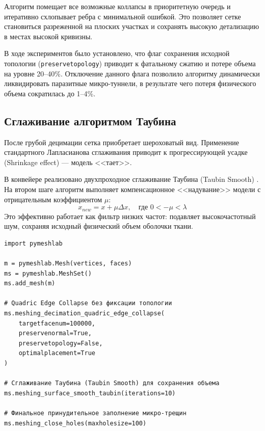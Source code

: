 \documentclass[a4paper,14pt]{article}
\begin{document}
Алгоритм помещает все возможные коллапсы в приоритетную очередь и итеративно схлопывает ребра с минимальной ошибкой. Это позволяет сетке становиться разреженной на плоских участках и сохранять высокую детализацию в местах высокой кривизны. 

В ходе экспериментов было установлено, что флаг сохранения исходной топологии (\texttt{preservetopology}) приводит к фатальному сжатию и потере объема на уровне 20--40\%. Отключение данного флага позволило алгоритму динамически ликвидировать паразитные микро-туннели, в результате чего потеря физического объема сократилась до 1--4\%.

\subsection{Сглаживание алгоритмом Таубина}
После грубой децимации сетка приобретает шероховатый вид. Применение стандартного Лапласианова сглаживания приводит к прогрессирующей усадке (Shrinkage effect) — модель <<тает>>.

В конвейере реализовано двухпроходное сглаживание Таубина (Taubin Smooth) \cite{taubin1995}. На втором шаге алгоритм выполняет компенсационное <<надувание>> модели с отрицательным коэффициентом $\mu$:
\begin{equation}
    x_{new} = x + \mu \Delta x, \quad \text{где } 0 < -\mu < \lambda
\end{equation}
Это эффективно работает как фильтр низких частот: подавляет высокочастотный шум, сохраняя исходный физический объем оболочки ткани.

\begin{lstlisting}[caption={Интеграция PyMeshLab для децимации}]
import pymeshlab

m = pymeshlab.Mesh(vertices, faces)
ms = pymeshlab.MeshSet()
ms.add_mesh(m)

# Quadric Edge Collapse без фиксации топологии
ms.meshing_decimation_quadric_edge_collapse(
    targetfacenum=100000, 
    preservenormal=True, 
    preservetopology=False, 
    optimalplacement=True
)

# Сглаживание Таубина (Taubin Smooth) для сохранения объема
ms.meshing_surface_smooth_taubin(iterations=10)

# Финальное принудительное заполнение микро-трещин
ms.meshing_close_holes(maxholesize=100)
\end{lstlisting}

\newpage
\end{document}
